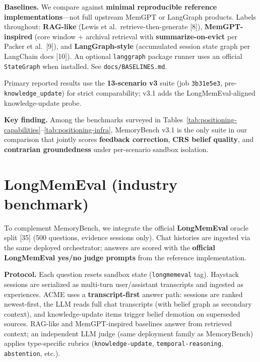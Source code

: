 \documentclass[11pt,a4paper]{article}
\begin{document}
\textbf{Baselines.} We compare against \textbf{minimal reproducible
reference implementations}---not full upstream MemGPT or LangGraph
products. Labels throughout: \textbf{RAG-like} (Lewis et
al.~retrieve-then-generate {[}8{]}), \textbf{MemGPT-inspired} (core
window + archival retrieval with \textbf{summarize-on-evict} per Packer
et al.~{[}9{]}), and \textbf{LangGraph-style} (accumulated session state
graph per LangChain docs {[}10{]}). An optional \texttt{langgraph}
package runner uses an official \texttt{StateGraph} when installed. See
\texttt{docs/BASELINES.md}.

\acmeTablePositioningCapabilities

Primary reported results use the \textbf{13-scenario v3} suite (job
\texttt{3b31e5e3}, pre-\texttt{knowledge\_update}) for strict
comparability; v3.1 adds the LongMemEval-aligned knowledge-update probe.

\acmeTablePositioningInfra

\begin{keyfinding}
\textbf{Key finding.} Among the benchmarks surveyed in Tables~\ref{tab:positioning-capabilities}--\ref{tab:positioning-infra}, MemoryBench v3.1 is the only suite in our comparison that jointly scores \textbf{feedback correction}, \textbf{CRS belief quality}, and \textbf{contrarian groundedness} under per-scenario sandbox isolation.
\end{keyfinding}

\section{LongMemEval (industry
benchmark)}\label{longmemeval-industry-benchmark}

To complement MemoryBench, we integrate the official
\textbf{LongMemEval} oracle split {[}35{]} (500 questions, evidence
sessions only). Chat histories are ingested via the same deployed
orchestrator; answers are scored with the \textbf{official LongMemEval
yes/no judge prompts} from the reference implementation.

\acmeTableLongMemEvalProtocol

\acmeTableLongMemEvalKU

\acmeTableLongMemEvalFull

\textbf{Protocol.} Each question resets sandbox state
(\texttt{longmemeval} tag). Haystack sessions are serialized as
multi-turn user/assistant transcripts and ingested as experiences. ACME
uses a \textbf{transcript-first} answer path: sessions are ranked
newest-first, the LLM reads full chat transcripts (with belief graph as
secondary context), and knowledge-update items trigger belief demotion
on superseded sources. RAG-like and MemGPT-inspired baselines answer
from retrieved context; an independent LLM judge (same deployment family
as MemoryBench) applies type-specific rubrics
(\texttt{knowledge-update}, \texttt{temporal-reasoning},
\texttt{abstention}, etc.).
\end{document}
